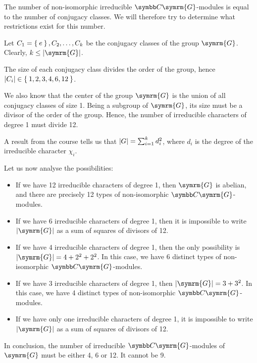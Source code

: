 \begin{solution}
The number of non-isomorphic irreducible \(\complex \symrm{G}\)-modules is equal to the number of conjugacy classes. We will therefore try to determine what restrictions exist for this number.

Let \(C_1 = \Set{e}, C_2, \dots, C_k\) be the conjugacy classes of the group \(\symrm{G}\). Clearly, \(k \leq \abs{\symrm{G}}\).
    
The size of each conjugacy class divides the order of the group, hence \(\left|C_i\right| \in \Set{ 1, 2, 3, 4, 6, 12 }\).

We also know that the center of the group \(\symrm{G}\) is the union of all conjugacy classes of size 1. Being a subgroup of \(\symrm{G}\), its size must be a divisor of the order of the group. Hence, the number of irreducible characters of degree 1 must divide 12.

A result from the course tells us that \(\left|G\right| = \sum_{i = 1}^{k} d_i^2\), where \(d_i\) is the degree of the irreducible character \(\chi_i\). 

Let us now analyse the possibilities:
\begin{itemize}
    \item If we have 12 irreducible characters of degree 1, then \(\symrm{G}\) is abelian, and there are precisely 12 types of non-isomorphic \(\complex \symrm{G}\)-modules.

    \item If we have 6 irreducible characters of degree 1, then it is impossible to write \(\abs{\symrm{G}}\) as a sum of squares of divisors of 12.
    
    \item If we have 4 irreducible characters of degree 1, then the only possibility is \(\abs{\symrm{G}} = 4 + 2^2 + 2^2\). In this case, we have 6 distinct types of non-isomorphic \(\complex \symrm{G}\)-modules.
    
    \item If we have 3 irreducible characters of degree 1, then \(\abs{\symrm{G}} = 3 + 3^2\). In this case, we have 4 distinct types of non-isomorphic \(\complex \symrm{G}\)-modules.
    
    \item If we have only one irreducible characters of degree 1, it is impossible to write \(\abs{\symrm{G}}\) as a sum of squares of divisors of 12.
\end{itemize}

In conclusion, the number of irreducible \(\complex \symrm{G}\)-modules of \(\symrm{G}\) must be either 4, 6 or 12. It cannot be 9.


\end{solution}
